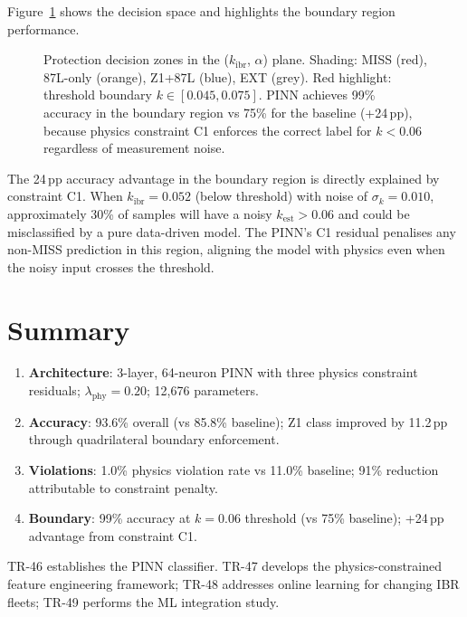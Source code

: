 \documentclass[11pt,a4paper]{article}
\begin{document}
Figure~\ref{fig:boundary} shows the decision space and highlights the
boundary region performance.

\begin{figure}[htbp]
  \centering
  \resizebox{0.88\textwidth}{!}{}
  \caption{Protection decision zones in the ($k_\mathrm{ibr}$, $\alpha$) plane.
           Shading: MISS (red), 87L-only (orange), Z1+87L (blue), EXT (grey).
           Red highlight: threshold boundary $k\in[0.045,0.075]$.  PINN
           achieves 99\% accuracy in the boundary region vs 75\% for the
           baseline (+24\,pp), because physics constraint C1 enforces the
           correct label for $k<0.06$ regardless of measurement noise.}
  \label{fig:boundary}
\end{figure}

\noindent
The 24\,pp accuracy advantage in the boundary region is directly explained by
constraint C1.  When $k_\mathrm{ibr}=0.052$ (below threshold) with noise of
$\sigma_k=0.010$, approximately 30\% of samples will have a noisy
$k_\mathrm{est}>0.06$ and could be misclassified by a pure data-driven model.
The PINN's C1 residual penalises any non-MISS prediction in this region,
aligning the model with physics even when the noisy input crosses the threshold.

\section{Summary}
\label{sec:summary}

\begin{enumerate}
  \item \textbf{Architecture}: 3-layer, 64-neuron PINN with three physics
    constraint residuals; $\lambda_\mathrm{phy}=0.20$; 12,676 parameters.

  \item \textbf{Accuracy}: 93.6\% overall (vs 85.8\% baseline); Z1 class
    improved by 11.2\,pp through quadrilateral boundary enforcement.

  \item \textbf{Violations}: 1.0\% physics violation rate vs 11.0\% baseline;
    91\% reduction attributable to constraint penalty.

  \item \textbf{Boundary}: 99\% accuracy at $k=0.06$ threshold (vs 75\%
    baseline); +24\,pp advantage from constraint C1.
\end{enumerate}

\noindent
TR-46 establishes the PINN classifier.  TR-47 develops the physics-constrained
feature engineering framework; TR-48 addresses online learning for changing
IBR fleets; TR-49 performs the ML integration study.



\end{document}
